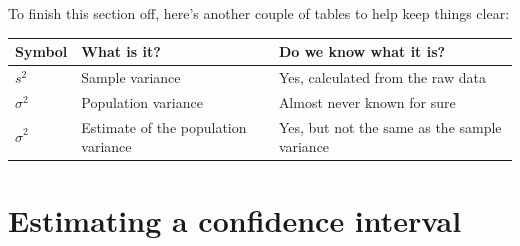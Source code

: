 \documentclass[
]{book}
\begin{document}
To finish this section off, here's another couple of tables to help keep things clear:

\begin{longtable}[]{@{}lll@{}}
\toprule
\begin{minipage}[b]{0.27\columnwidth}\raggedright
Symbol\strut
\end{minipage} & \begin{minipage}[b]{0.32\columnwidth}\raggedright
What is it?\strut
\end{minipage} & \begin{minipage}[b]{0.32\columnwidth}\raggedright
Do we know what it is?\strut
\end{minipage}\tabularnewline
\midrule
\endhead
\begin{minipage}[t]{0.27\columnwidth}\raggedright
\(s^2\)\strut
\end{minipage} & \begin{minipage}[t]{0.32\columnwidth}\raggedright
Sample variance\strut
\end{minipage} & \begin{minipage}[t]{0.32\columnwidth}\raggedright
Yes, calculated from the raw data\strut
\end{minipage}\tabularnewline
\begin{minipage}[t]{0.27\columnwidth}\raggedright
\(\sigma^2\)\strut
\end{minipage} & \begin{minipage}[t]{0.32\columnwidth}\raggedright
Population variance\strut
\end{minipage} & \begin{minipage}[t]{0.32\columnwidth}\raggedright
Almost never known for sure\strut
\end{minipage}\tabularnewline
\begin{minipage}[t]{0.27\columnwidth}\raggedright
\(\hat{\sigma}^2\)\strut
\end{minipage} & \begin{minipage}[t]{0.32\columnwidth}\raggedright
Estimate of the population variance\strut
\end{minipage} & \begin{minipage}[t]{0.32\columnwidth}\raggedright
Yes, but not the same as the sample variance\strut
\end{minipage}\tabularnewline
\bottomrule
\end{longtable}

\hypertarget{estimating-a-confidence-interval}{%
\section{Estimating a confidence interval}\label{estimating-a-confidence-interval}}
\end{document}
